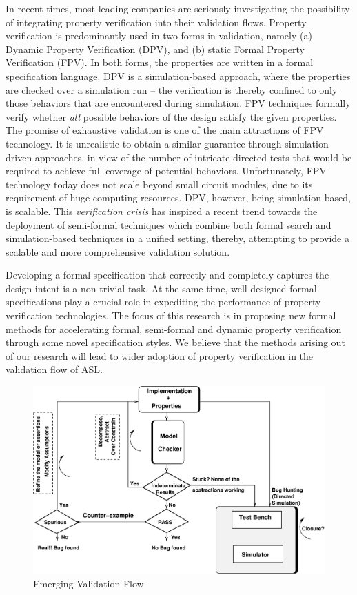\noindent
In recent times, most leading companies are seriously investigating the possibility of
integrating property verification into their validation flows.
Property verification is predominantly used in two forms in 
validation, namely (a) Dynamic Property Verification (DPV), and
(b) static Formal Property Verification (FPV). In both forms, the properties
are written in a formal specification language. DPV is a simulation-based
approach, where the properties are checked over a simulation run -- the
verification is thereby confined to only those behaviors that are encountered
during simulation. FPV techniques formally verify whether {\em all} possible
behaviors of the design satisfy the given properties. The promise of
exhaustive validation is one of the main attractions of FPV technology. It is
unrealistic to obtain a similar guarantee through simulation driven approaches,
in view of the number of intricate directed tests that would be required to
achieve full coverage of potential behaviors. Unfortunately, FPV technology
today does not scale beyond small circuit modules, due to its requirement
of huge computing resources. DPV, however, being simulation-based, is scalable.
This {\em verification crisis} has inspired a recent trend
towards the deployment of semi-formal techniques which combine both
formal search and simulation-based techniques in a unified setting,
thereby, attempting to provide a scalable and more comprehensive
validation solution. 

\noindent
Developing a formal specification that correctly and completely captures the
design intent is a non trivial task. At the same time, well-designed 
formal specifications play a crucial role in expediting the performance 
of property verification technologies. The focus of this research is in 
proposing new formal methods for accelerating formal, semi-formal and 
dynamic property verification through some novel specification styles. We 
believe that the methods arising out of our research 
will lead to wider adoption of property verification in the
validation flow of ASL.

\begin{figure}[htb]
\centering
\includegraphics[scale = 0.7]{../intro/intro.eps}
\caption{Emerging Validation Flow} \label{fig1.2}
\end{figure}

